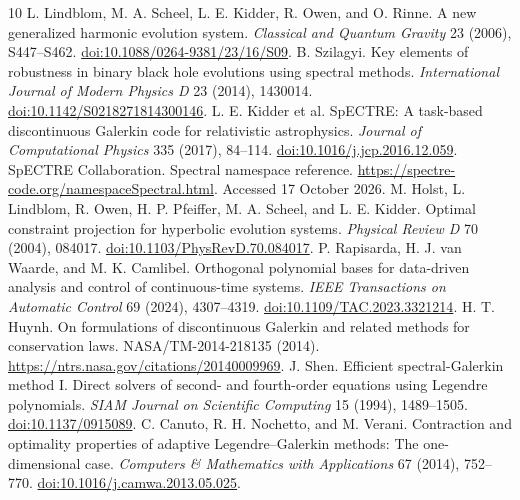 \documentclass[11pt]{article}
\begin{document}
\begin{thebibliography}{10}\small
{} L. Lindblom, M. A. Scheel, L. E. Kidder, R. Owen, and O. Rinne. A new generalized harmonic evolution system. \emph{Classical and Quantum Gravity} 23 (2006), S447--S462. \href{https://doi.org/10.1088/0264-9381/23/16/S09}{doi:10.1088/0264-9381/23/16/S09}.
 B. Szilagyi. Key elements of robustness in binary black hole evolutions using spectral methods. \emph{International Journal of Modern Physics D} 23 (2014), 1430014. \href{https://doi.org/10.1142/S0218271814300146}{doi:10.1142/S0218271814300146}.
 L. E. Kidder et al. SpECTRE: A task-based discontinuous Galerkin code for relativistic astrophysics. \emph{Journal of Computational Physics} 335 (2017), 84--114. \href{https://doi.org/10.1016/j.jcp.2016.12.059}{doi:10.1016/j.jcp.2016.12.059}.
 SpECTRE Collaboration. Spectral namespace reference. \url{https://spectre-code.org/namespaceSpectral.html}. Accessed 17 October 2026.
 M. Holst, L. Lindblom, R. Owen, H. P. Pfeiffer, M. A. Scheel, and L. E. Kidder. Optimal constraint projection for hyperbolic evolution systems. \emph{Physical Review D} 70 (2004), 084017. \href{https://doi.org/10.1103/PhysRevD.70.084017}{doi:10.1103/PhysRevD.70.084017}.
 P. Rapisarda, H. J. van Waarde, and M. K. Camlibel. Orthogonal polynomial bases for data-driven analysis and control of continuous-time systems. \emph{IEEE Transactions on Automatic Control} 69 (2024), 4307--4319. \href{https://doi.org/10.1109/TAC.2023.3321214}{doi:10.1109/TAC.2023.3321214}.
 H. T. Huynh. On formulations of discontinuous Galerkin and related methods for conservation laws. NASA/TM-2014-218135 (2014). \url{https://ntrs.nasa.gov/citations/20140009969}.
 J. Shen. Efficient spectral-Galerkin method I. Direct solvers of second- and fourth-order equations using Legendre polynomials. \emph{SIAM Journal on Scientific Computing} 15 (1994), 1489--1505. \href{https://doi.org/10.1137/0915089}{doi:10.1137/0915089}.
 C. Canuto, R. H. Nochetto, and M. Verani. Contraction and optimality properties of adaptive Legendre--Galerkin methods: The one-dimensional case. \emph{Computers \& Mathematics with Applications} 67 (2014), 752--770. \href{https://doi.org/10.1016/j.camwa.2013.05.025}{doi:10.1016/j.camwa.2013.05.025}.
\end{thebibliography}
\end{document}
